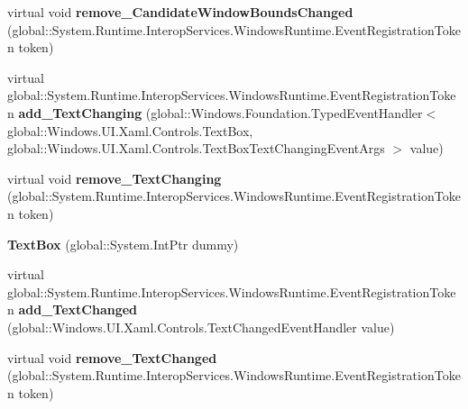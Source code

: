 \begin{DoxyCompactItemize}
\item 
\mbox{\label{class_windows_1_1_u_i_1_1_xaml_1_1_controls_1_1_text_box_a69264830074f27caa404569cb91f24af}} 
virtual void {\bfseries remove\+\_\+\+Candidate\+Window\+Bounds\+Changed} (global\+::\+System.\+Runtime.\+Interop\+Services.\+Windows\+Runtime.\+Event\+Registration\+Token token)
\item 
\mbox{\label{class_windows_1_1_u_i_1_1_xaml_1_1_controls_1_1_text_box_acb77f51967d36ae23348c70a69fb0313}} 
virtual global\+::\+System.\+Runtime.\+Interop\+Services.\+Windows\+Runtime.\+Event\+Registration\+Token {\bfseries add\+\_\+\+Text\+Changing} (global\+::\+Windows.\+Foundation.\+Typed\+Event\+Handler$<$ global\+::\+Windows.\+U\+I.\+Xaml.\+Controls.\+Text\+Box, global\+::\+Windows.\+U\+I.\+Xaml.\+Controls.\+Text\+Box\+Text\+Changing\+Event\+Args $>$ value)
\item 
\mbox{\label{class_windows_1_1_u_i_1_1_xaml_1_1_controls_1_1_text_box_aacef19be208dde1a5d0585bc1113f0bd}} 
virtual void {\bfseries remove\+\_\+\+Text\+Changing} (global\+::\+System.\+Runtime.\+Interop\+Services.\+Windows\+Runtime.\+Event\+Registration\+Token token)
\item 
\mbox{\label{class_windows_1_1_u_i_1_1_xaml_1_1_controls_1_1_text_box_adcfa94babf525333e555cfc9f2b34314}} 
{\bfseries Text\+Box} (global\+::\+System.\+Int\+Ptr dummy)
\item 
\mbox{\label{class_windows_1_1_u_i_1_1_xaml_1_1_controls_1_1_text_box_a206b2889087ba0dbfe818431045788ff}} 
virtual global\+::\+System.\+Runtime.\+Interop\+Services.\+Windows\+Runtime.\+Event\+Registration\+Token {\bfseries add\+\_\+\+Text\+Changed} (global\+::\+Windows.\+U\+I.\+Xaml.\+Controls.\+Text\+Changed\+Event\+Handler value)
\item 
\mbox{\label{class_windows_1_1_u_i_1_1_xaml_1_1_controls_1_1_text_box_a35ae456324ad400806b770d7c47c57b4}} 
virtual void {\bfseries remove\+\_\+\+Text\+Changed} (global\+::\+System.\+Runtime.\+Interop\+Services.\+Windows\+Runtime.\+Event\+Registration\+Token token)

\end{DoxyCompactItemize}
